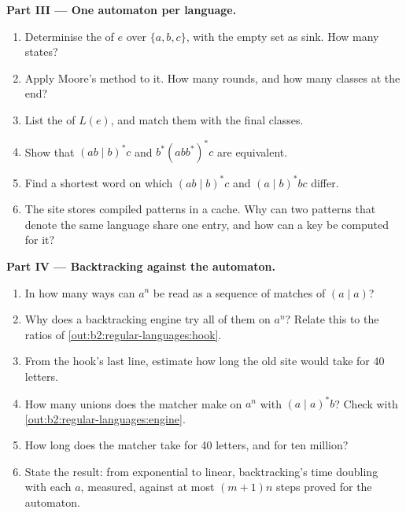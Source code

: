 \begin{problem}
\medskip\noindent\textbf{Part III --- One automaton per language.}\par\nopagebreak
\begin{enumerate}[resume, beginpenalty=10000]
\item Determinise the  of $e$ over $\{a, b, c\}$, with the empty set as sink. How many states?
\item Apply Moore's method to it. How many rounds, and how many classes at the end?
\item List the  of $L(e)$, and match them with the final classes.
\item Show that $(ab \mid b)^*c$ and $b^*(abb^*)^*c$ are equivalent.
\item Find a shortest word on which $(ab \mid b)^*c$ and $(a \mid b)^*bc$ differ.
\item The site stores compiled patterns in a cache. Why can two patterns that denote the same language share one
entry, and how can a key be computed for it?
\end{enumerate}

\medskip\noindent\textbf{Part IV --- Backtracking against the automaton.}\par\nopagebreak
\begin{enumerate}[resume, beginpenalty=10000]
\item In how many ways can $a^n$ be read as a sequence of matches of $(a \mid a)$?
\item Why does a backtracking engine try all of them on $a^n$? Relate this to the ratios of
\cref{out:b2:regular-languages:hook}.
\item From the hook's last line, estimate how long the old site would take for 40 letters.
\item How many unions does the matcher make on $a^n$ with $(a \mid a)^*b$? Check with
\cref{out:b2:regular-languages:engine}.
\item How long does the matcher take for 40 letters, and for ten million?
\item State the result: from exponential to linear, backtracking's time doubling with each $a$, measured, against at
most $(m + 1)n$ steps proved for the automaton.
\end{enumerate}
\end{problem}
